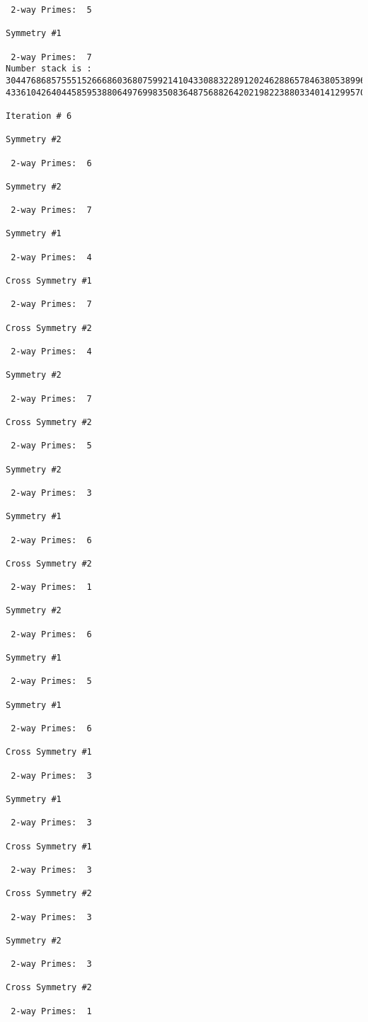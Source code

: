 {{{{\begin{verbatim}
 2-way Primes: 	5

Symmetry #1

 2-way Primes: 	7
Number stack is :
30447686857555152666860368075992141043308832289120246288657846380538996794608835958544046240163340857
43361042640445859538806497699835083648756882642021982238803340141299570863068666251555758686744037580

Iteration #	6

Symmetry #2

 2-way Primes: 	6

Symmetry #2

 2-way Primes: 	7

Symmetry #1

 2-way Primes: 	4

Cross Symmetry #1

 2-way Primes: 	7

Cross Symmetry #2

 2-way Primes: 	4

Symmetry #2

 2-way Primes: 	7

Cross Symmetry #2

 2-way Primes: 	5

Symmetry #2

 2-way Primes: 	3

Symmetry #1

 2-way Primes: 	6

Cross Symmetry #2

 2-way Primes: 	1

Symmetry #2

 2-way Primes: 	6

Symmetry #1

 2-way Primes: 	5

Symmetry #1

 2-way Primes: 	6

Cross Symmetry #1

 2-way Primes: 	3

Symmetry #1

 2-way Primes: 	3

Cross Symmetry #1

 2-way Primes: 	3

Cross Symmetry #2

 2-way Primes: 	3

Symmetry #2

 2-way Primes: 	3

Cross Symmetry #2

 2-way Primes: 	1


\end{verbatim}}}}}
